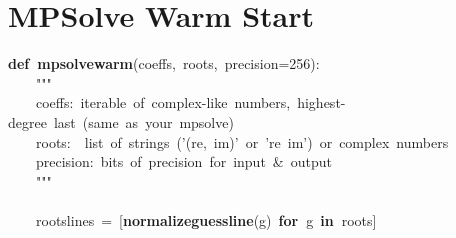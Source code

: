 \documentclass{article}\usepackage[]{graphicx}\usepackage[dvipsnames,table]{xcolor}
\makeatletter
\newcommand{\hlnum}[1]{\textcolor[rgb]{0.686,0.059,0.569}{#1}}%
\newcommand{\hlsng}[1]{\textcolor[rgb]{0.192,0.494,0.8}{#1}}%
\newcommand{\hlopt}[1]{\textcolor[rgb]{0,0,0}{#1}}%
\newcommand{\hldef}[1]{\textcolor[rgb]{0.345,0.345,0.345}{#1}}%
\newcommand{\hlkwa}[1]{\textcolor[rgb]{0.161,0.373,0.58}{\textbf{#1}}}%
\newcommand{\hlkwd}[1]{\textcolor[rgb]{0.737,0.353,0.396}{\textbf{#1}}}%
\newenvironment{kframe}{%
 \def\at@end@of@kframe{}%
 \ifinner\ifhmode%
  \def\at@end@of@kframe{\end{minipage}}%
  \begin{minipage}{\columnwidth}%
 \fi\fi%
 \def\FrameCommand##1{\hskip\@totalleftmargin \hskip-\fboxsep
 \colorbox{shadecolor}{##1}\hskip-\fboxsep
     \hskip-\linewidth \hskip-\@totalleftmargin \hskip\columnwidth}%
 \MakeFramed {\advance\hsize-\width
   \@totalleftmargin\z@ \linewidth\hsize
   \@setminipage}}%
 {\par\unskip\endMakeFramed%
 \at@end@of@kframe}
\newenvironment{knitrout}{}{} %
\makeatother
\begin{document}
\newpage
\section{MPSolve Warm Start}
\begin{center}
\begin{minipage}[m]{18cm}
\begin{knitrout}\tiny
{}\color{fgcolor}\begin{kframe}
\noindent
\ttfamily
\hldef{}\hlkwa{def\ }\hldef{}\hlkwd{mpsolve\textunderscore warm}\hldef{}\hlopt{(}\hldef{coeffs}\hlopt{,\ }\hldef{roots}\hlopt{,\ }\hldef{precision}\hlopt{=}\hldef{}\hlnum{256}\hldef{}\hlopt{):}\hspace*{\fill}\\
\hldef{}\hldef{\ \ \ \ }\hldef{}\hlsng{"""}\hspace*{\fill}\\
\hlsng{}\hldef{\ \ \ \ }\hlsng{coeffs:\ iterable\ of\ complex{-}like\ numbers,\ highest{-}degree\ last\ (same\ as\ your\ mpsolve)}\hspace*{\fill}\\
\hlsng{}\hldef{\ \ \ \ }\hlsng{roots:}\hldef{\ \ }\hlsng{list\ of\ strings\ ('(re,\ im)'\ or\ 're\ im')\ or\ complex\ numbers}\hspace*{\fill}\\
\hlsng{}\hldef{\ \ \ \ }\hlsng{precision:\ bits\ of\ precision\ for\ input\ \&\ output}\hspace*{\fill}\\
\hlsng{}\hldef{\ \ \ \ }\hlsng{"""}\hldef{}\hspace*{\fill}\\
\hldef{}\hldef{\ \ \ \ }\hldef{}\hspace*{\fill}\\
\hldef{}\hldef{\ \ \ \ }\hldef{roots\textunderscore lines\ }\hlopt{=\ {[}}\hldef{}\hlkwd{\textunderscore normalize\textunderscore guess\textunderscore line}\hldef{}\hlopt{(}\hldef{g}\hlopt{)\ }\hldef{}\hlkwa{for\ }\hldef{g\ }\hlkwa{in\ }\hldef{roots}\hlopt{{]}}\hspace*{\fill}\\
\hldef{}\hspace*{\fill}\\
\hldef{}\hldef{\ \ \ \ }\hldef{}\hspace*{\fill}\\

\end{kframe}
\end{knitrout}
\end{minipage}
\end{center}
\end{document}
